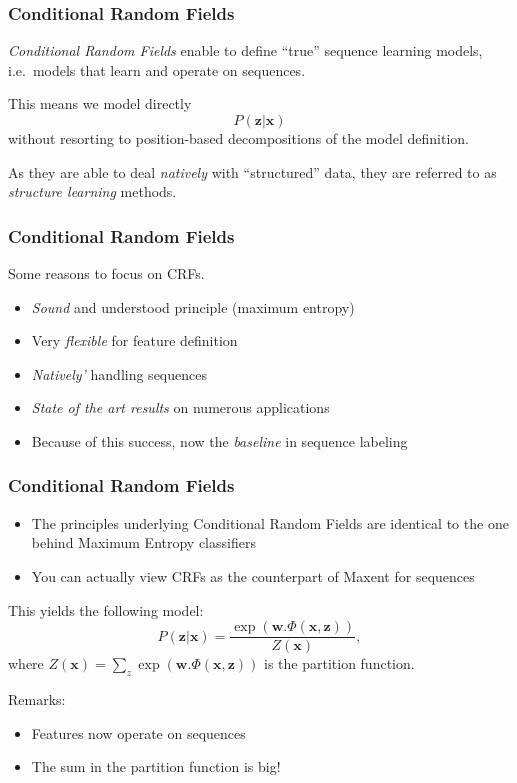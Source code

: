 \documentclass[usenames,dvipsnames]{beamer}
\newcommand{\x}{\mathbf{x}}
\newcommand{\w}{\mathbf{w}}
\newcommand{\z}{\mathbf{z}}
\newcommand{\voc}[1]{\emph{\color{ForestGreen}#1}}
\begin{document}
\begin{frame}\frametitle{Conditional Random Fields}

\voc{Conditional Random Fields} enable to define ``true'' sequence learning
models, i.e.\ models that learn and operate on sequences.

\vspace{0.4cm}
This means we model directly
\begin{equation*}
P(\z|\x)
\end{equation*}
without resorting to position-based decompositions of the model definition.

\vspace{0.4cm}
As they are able to deal \emph{natively} with ``structured'' data, they are
referred to as \voc{structure learning} methods.
\end{frame}


\begin{frame}\frametitle{Conditional Random Fields}
Some reasons to focus on CRFs.
\begin{itemize}
\item \emph{Sound} and understood principle (maximum entropy)
\item Very \emph{flexible} for feature definition
\item \emph{Natively'} handling sequences
\item \emph{State of the art results} on numerous applications
\item Because of this success, now the \emph{baseline} in sequence
  labeling
\end{itemize}

\end{frame}

\begin{frame}\frametitle{Conditional Random Fields}

\begin{itemize}
\item The principles underlying Conditional Random Fields are identical to
the one behind Maximum Entropy classifiers
\item You can actually view CRFs as the counterpart of Maxent for
  sequences
\end{itemize}

\pause
This yields the following model:
\vspace{0.4cm}
\begin{equation*}
P(\z|\x) = \frac{\exp(\w . \Phi(\x,\z))}{Z(\x)},
\end{equation*}
where $Z(\x) = \sum_z \exp(\w . \Phi(\x,\z))$ is the partition function.

\vspace{0.4cm}
Remarks:
\begin{itemize}
\item Features now operate on sequences
\item The sum in the partition function is big!
\end{itemize}

\end{frame}
\end{document}

